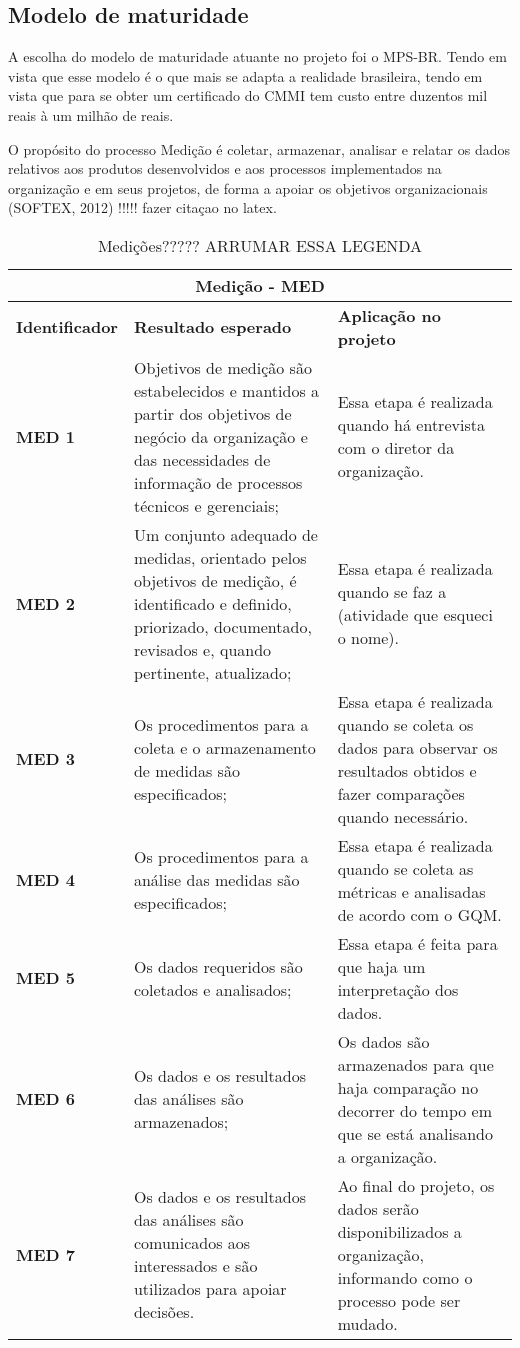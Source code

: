 \subsection{Modelo de maturidade}

  A escolha do modelo de maturidade atuante no projeto foi o MPS-BR. Tendo em vista que esse modelo é o que mais se adapta a realidade brasileira, tendo em vista que para se obter um certificado do CMMI  tem custo entre duzentos mil reais à um milhão de reais.

  O propósito do processo Medição é coletar, armazenar, analisar e relatar os dados relativos aos produtos desenvolvidos e aos processos implementados na organização e em seus projetos, de forma a apoiar os objetivos organizacionais (SOFTEX, 2012) !!!!! fazer citaçao no latex.

  \begin{table}[H]
  \centering
  \begin{tabular}{|p{3cm}|p{5cm}|p{3cm}|}
  \hline
    \multicolumn{3}{|c|}{\textbf{Medição - MED}} \\ \hline
    \textbf{Identificador} & \textbf{Resultado esperado} & \textbf{Aplicação no projeto} \\ \hline
    \textbf{MED 1} & Objetivos de medição são estabelecidos e mantidos a partir dos objetivos de negócio da organização e das necessidades de informação de processos técnicos e gerenciais; & Essa etapa é realizada quando há entrevista com o diretor da organização. \\ \hline
    \textbf{MED 2} & Um conjunto adequado de medidas, orientado pelos objetivos de medição, é identificado e definido, priorizado, documentado, revisados e, quando pertinente, atualizado; & Essa etapa é realizada quando se faz a (atividade que esqueci o nome). \\ \hline
    \textbf{MED 3} & Os procedimentos para a coleta e o armazenamento de medidas são especificados; & Essa etapa é realizada quando se coleta os dados para observar os resultados obtidos e fazer comparações quando necessário. \\ \hline
    \textbf{MED 4} & Os procedimentos para a análise das medidas são especificados; & Essa etapa é realizada quando se coleta as métricas e analisadas de acordo com o GQM. \\ \hline
    \textbf{MED 5} & Os dados requeridos são coletados e analisados; & Essa etapa é feita para que haja um interpretação dos dados. \\ \hline
    \textbf{MED 6} & Os dados e os resultados das análises são armazenados; & Os dados são armazenados para que haja comparação no decorrer do tempo em que se está analisando a organização. \\ \hline
    \textbf{MED 7} & Os dados e os resultados das análises são comunicados aos interessados e são utilizados para apoiar decisões. & Ao final do projeto, os dados serão disponibilizados a organização, informando como o processo pode ser mudado. \\ \hline
  \end{tabular}
  \caption{Medições????? ARRUMAR ESSA LEGENDA}
  \label{tab:medicoes}
  \end{table}

